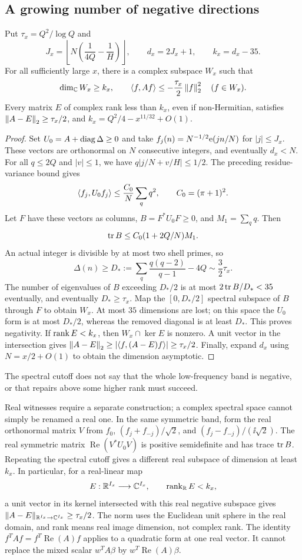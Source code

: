 \subsection{A growing number of negative directions}
\begin{theorem}\label{thm:rank}
Put $\tau_x=Q^2/\log Q$ and
\[
J_x=\left\lfloor N\left(\frac1{4Q}-\frac1H\right)\right\rfloor,\qquad
d_x=2J_x+1,\qquad k_x=d_x-35.
\]
For all sufficiently large $x$, there is a complex subspace $W_x$ such that
\[
\dim_\mathbb C W_x\ge k_x,\qquad
\langle f,Af\rangle\le-\frac{\tau_x}{2}\left\|f\right\|_2^2\quad(f\in W_x).
\]
Every matrix $E$ of complex rank less than $k_x$, even if non-Hermitian, satisfies
$\left\|A-E\right\|_2\ge\tau_x/2$, and $k_x=Q^2/4-x^{11/32}+O(1)$.
\end{theorem}
\begin{proof}
Set $U_0=A+\operatorname{diag}\Delta\ge0$ and take $f_j(n)=N^{-1/2}\mathrm e(jn/N)$ for $|j|\le J_x$. These vectors are orthonormal on $N$ consecutive integers, and eventually $d_x<N$. For all $q\le2Q$ and $|v|\le1$, we have $q|j/N+v/H|\le1/2$. The preceding residue-variance bound gives
\[
\langle f_j,U_0f_j\rangle\le\frac{C_0}{N}\sum_q q^2,\qquad C_0=(\pi+1)^2.
\]
Let $F$ have these vectors as columns, $B=F^*U_0F\ge0$, and $M_1=\sum_q q$. Then
\[
\operatorname{tr} B\le C_0(1+2Q/N)M_1.
\]
An actual integer is divisible by at most two shell primes, so
\[
\Delta(n)\ge D_*:=\sum_q\frac{q(q-2)}{q-1}-4Q\sim\frac32\tau_x.
\]
The number of eigenvalues of $B$ exceeding $D_*/2$ is at most $2\operatorname{tr} B/D_*<35$ eventually, and eventually $D_*\ge\tau_x$. Map the $[0,D_*/2]$ spectral subspace of $B$ through $F$ to obtain $W_x$. At most $35$ dimensions are lost; on this space the $U_0$ form is at most $D_*/2$, whereas the removed diagonal is at least $D_*$. This proves negativity. If $\operatorname{rank} E<k_x$, then $W_x\cap\ker E$ is nonzero. A unit vector in the intersection gives
$\left\|A-E\right\|_2\ge|\langle f,(A-E)f\rangle|\ge\tau_x/2$.
Finally, expand $d_x$ using $N=x/2+O(1)$ to obtain the dimension asymptotic.
\end{proof}
The spectral cutoff does not say that the whole low-frequency band is negative, or that repairs above some higher rank must succeed.

Real witnesses require a separate construction; a complex spectral space cannot simply be renamed a real one. In the same symmetric band, form the real orthonormal matrix $V$ from
$f_0$, $(f_j+f_{-j})/\sqrt2$, and $(f_j-f_{-j})/(\ii\sqrt2)$.
The real symmetric matrix $\operatorname{Re}(V^*U_0V)$ is positive semidefinite and has trace $\operatorname{tr} B$. Repeating the spectral cutoff gives a different real subspace of dimension at least $k_x$. In particular, for a real-linear map
\[
E:\mathbb R^{I_x}\longrightarrow\mathbb C^{I_x},\qquad\operatorname{rank}_{\mathbb R}E<k_x,
\]
a unit vector in its kernel intersected with this real negative subspace gives
$\|A-E\|_{\mathbb R^{I_x}\to\mathbb C^{I_x}}\ge\tau_x/2$.
The norm uses the Euclidean unit sphere in the real domain, and rank means real image dimension, not complex rank. The identity
$f^TAf=f^T\operatorname{Re}(A)f$ applies to a quadratic form at one real vector. It cannot replace the mixed scalar $w^TA\beta$ by $w^T\operatorname{Re}(A)\beta$.
